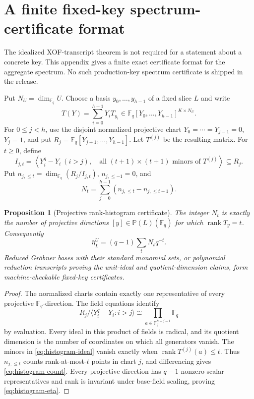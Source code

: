 \documentclass[11pt]{article}
\newtheorem{proposition}[proposition]{Proposition}
\newcommand{\F}{\mathbb F}
\newcommand{\rank}{\operatorname{rank}}
\begin{document}
\section{A finite fixed-key spectrum-certificate format}\label{app:fixed-key-spectrum}
The idealized XOF-transcript theorem is not required for a statement about a concrete key.
This appendix gives a finite exact certificate format for the aggregate
spectrum.  No such production-key spectrum certificate is shipped in the
release.

Put $N_U=\dim_{\F_q}U$.  Choose a basis
$y_0,\ldots,y_{h-1}$ of a fixed slice $L$ and write
\[
 T(Y)=\sum_{i=0}^{h-1}Y_iT_{y_i}
 \in\F_q[Y_0,\ldots,Y_{h-1}]^{K\times N_U}.
\]
For $0\le j<h$, use the disjoint normalized projective chart
$Y_0=\cdots=Y_{j-1}=0$, $Y_j=1$, and put
$R_j=\F_q[Y_{j+1},\ldots,Y_{h-1}]$.  Let $T^{(j)}$ be the resulting matrix.
For $t\ge0$, define
\begin{equation}
 I_{j,t}=\left\langle
   Y_i^q-Y_i\ (i>j),\quad
   \text{all }(t+1)\times(t+1)\text{ minors of }T^{(j)}
 \right\rangle\subseteq R_j.                        \label{eq:histogram-ideal}
\end{equation}
Put $n_{j,\le t}=\dim_{\F_q}(R_j/I_{j,t})$,
$n_{j,\le-1}=0$, and
\begin{equation}
  N_t=\sum_{j=0}^{h-1}(n_{j,\le t}-n_{j,\le t-1}). \label{eq:histogram-count}
\end{equation}

\begin{proposition}[Projective rank-histogram certificate]
\label{prop:projective-histogram}
The integer $N_t$ is exactly the number of projective directions
$[y]\in\mathbb P(L)(\F_q)$ for which $\rank T_y=t$.  Consequently
\begin{equation}
  \bar\eta_L^U=(q-1)\sum_tN_tq^{-t}.                 \label{eq:histogram-eta}
\end{equation}
Reduced Gr\"obner bases with their standard monomial sets, or polynomial
reduction transcripts proving the unit-ideal and quotient-dimension claims,
form machine-checkable fixed-key certificates.
\end{proposition}

\begin{proof}
The normalized charts contain exactly one representative of every projective
$\F_q$-direction.  The field equations identify
\[
 R_j/\langle Y_i^q-Y_i:i>j\rangle
 \cong\prod_{a\in\F_q^{h-j-1}}\F_q
\]
by evaluation.  Every ideal in this product of fields is radical, and its
quotient dimension is the number of coordinates on which all generators
vanish.  The minors in \eqref{eq:histogram-ideal} vanish exactly when
$\rank T^{(j)}(a)\le t$.  Thus $n_{j,\le t}$ counts rank-at-most-$t$ points
in chart $j$, and differencing gives \eqref{eq:histogram-count}.  Every
projective direction has $q-1$ nonzero scalar representatives and rank is
invariant under base-field scaling, proving \eqref{eq:histogram-eta}.
\end{proof}
\end{document}
